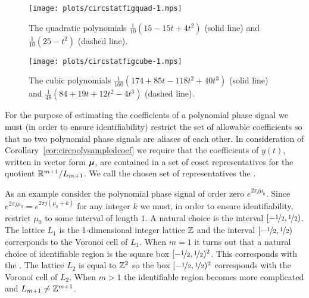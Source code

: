 \documentclass[journal]{IEEEtran}
\begin{document}
\begin{figure}[p]
	\centering
		\texttt{[image: plots/circstatfigquad-1.mps]}
		\caption{The quadratic polynomials $\tfrac{1}{10} (15 - 15 t + 4 t^2)$ (solid line) and $\tfrac{1}{10}(25 -  t^2)$  (dashed line).}
		\label{fig:circstatplot_quad}
\end{figure}

\begin{figure}[p]
	\centering
		\texttt{[image: plots/circstatfigcube-1.mps]}
		\caption{The cubic polynomials $\tfrac{1}{160} (174 + 85 t - 118 t^2 + 40 t^3)$ (solid line) and $\tfrac{1}{48} (84 + 19 t + 12 t^2 - 4 t^3)$  (dashed line).}
		\label{fig:circstatplot_cube}
\end{figure}

For the purpose of estimating the coefficients of a polynomial phase signal we must (in order to ensure identifiability) restrict the set of allowable coefficients so that no two polynomial phase signals are aliases of each other. In consideration of Corollary~\ref{cor:circpolysampledcoef} we require that the coefficients of $y(t)$, written in vector form $\boldsymbol{\mu}$, are contained in a set of coset representatives for the quotient ${\mathbb R}^{m+1}/L_{m+1}$.  We call the chosen set of representatives the .

As an example consider the polynomial phase signal of order zero $e^{2\pi j \mu_0}$.  Since $e^{2\pi j \mu_0} = e^{2\pi j(\mu_0 + k)}$ for any integer $k$ we must, in order to ensure identifiability, restrict $\mu_0$ to some interval of length $1$.  A natural choice is the interval $[-\nicefrac{1}{2}, \nicefrac{1}{2})$. The lattice $L_1$ is the 1-dimensional integer lattice ${\mathbb Z}$ and the interval $[-\nicefrac{1}{2}, \nicefrac{1}{2})$ corresponds to the Voronoi cell of $L_1$. 
When $m=1$ it turns out that a natural choice of identifiable region is the square box $[-\nicefrac{1}{2}, \nicefrac{1}{2})^2$. This corresponds with the .  The lattice $L_2$ is equal to ${\mathbb Z}^2$ so the box $[-\nicefrac{1}{2}, \nicefrac{1}{2})^2$ corresponds with the Voronoi cell of $L_2$.  
When $m > 1$ the identifiable region becomes more complicated and $L_{m+1} \neq {\mathbb Z}^{m+1}$. %
\end{document}
